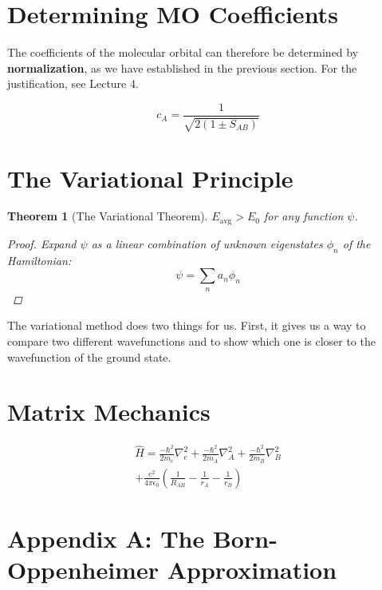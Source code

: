 \documentclass[a4paper]{tufte-handout}
\newtheorem{theorem}{Theorem}
\theoremstyle{definition}
\begin{document}
\section{Determining MO Coefficients}

The coefficients of the  molecular orbital can therefore be determined by \textbf{normalization}, as we have established
in the previous section. For the justification, see Lecture 4. 

\begin{equation}
  c_A = \frac{1}{\sqrt{2 (1 \pm S_{AB})}}
\end{equation}

\section{The Variational Principle}

\begin{theorem}[The Variational Theorem] $E_{\mathrm{avg}} > E_0$ for any function $\psi$. 

  \begin{proof}
    Expand $\psi$ as a linear combination of unknown eigenstates $\phi_n$ of the Hamiltonian:
    \begin{equation*}
      \psi = \sum_n a_n \phi_n
    \end{equation*}
  \end{proof}
  
\end{theorem}

The variational method does two things for us. First, it gives us a way to compare two 
different wavefunctions and to show which one is closer to the wavefunction of the ground state. 

\section{Matrix Mechanics}

\begin{align}
  \hat{H} = \frac{-\hbar^2}{2m_e}\nabla^2_e + \frac{-\hbar^2}{2m_A}\nabla^2_A + \frac{-\hbar^2}{2m_B}\nabla^2_B \\
  + \frac{e^2}{4\pi\epsilon_0} \left( \frac{1}{R_{AB}} - \frac{1}{r_{A}} - \frac{1}{r_{B}} \right)
\end{align}

\section{Appendix A: The Born-Oppenheimer Approximation}
\end{document}
